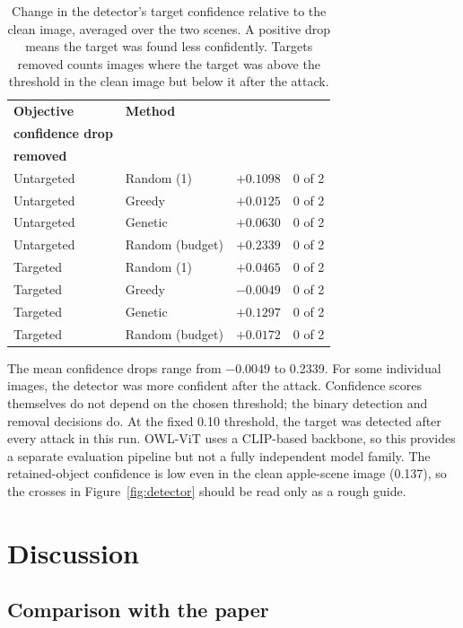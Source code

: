 \documentclass[11pt]{article}
\begin{document}
\begin{table}[!h]
\centering
\small
\caption{Change in the detector's target confidence relative to the clean image, averaged over the two scenes. A positive drop means the target was found less confidently. Targets removed counts images where the target was above the threshold in the clean image but below it after the attack.}
\label{tab:detector}
\begin{tabular}{@{}llrc@{}}
\toprule
\textbf{Objective} & \textbf{Method} & \shortstack{\textbf{Mean target}\\\textbf{confidence drop}} & \shortstack{\textbf{Targets}\\\textbf{removed}} \\
\midrule
Untargeted & Random (1) & $+0.1098$ & 0 of 2 \\
Untargeted & Greedy & $+0.0125$ & 0 of 2 \\
Untargeted & Genetic & $+0.0630$ & 0 of 2 \\
Untargeted & Random (budget) & $+0.2339$ & 0 of 2 \\
\addlinespace
Targeted & Random (1) & $+0.0465$ & 0 of 2 \\
Targeted & Greedy & $-0.0049$ & 0 of 2 \\
Targeted & Genetic & $+0.1297$ & 0 of 2 \\
Targeted & Random (budget) & $+0.0172$ & 0 of 2 \\
\bottomrule
\end{tabular}
\end{table}

The mean confidence drops range from $-0.0049$ to 0.2339. For some individual images, the detector was more confident after the attack. Confidence scores themselves do not depend on the chosen threshold; the binary detection and removal decisions do. At the fixed 0.10 threshold, the target was detected after every attack in this run. OWL-ViT uses a CLIP-based backbone, so this provides a separate evaluation pipeline but not a fully independent model family. The retained-object confidence is low even in the clean apple-scene image (0.137), so the crosses in Figure~\ref{fig:detector} should be read only as a rough guide.

\section{Discussion}

\subsection{Comparison with the paper}
\end{document}
